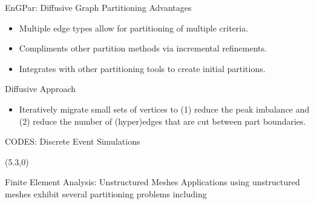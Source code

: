 \documentclass{beamer}
\begin{document}
\begin{textblock}{15.6}
\begin{textblock}{5}
\begin{block}{\centering EnGPar: Diffusive Graph Partitioning}
      Advantages
      \begin{itemize}
      \item Multiple edge types allow for partitioning of multiple criteria.
      \item Compliments other partition methods via incremental refinements.
      \item Integrates with other partitioning tools to create initial partitions.
      \end{itemize}
      
      Diffusive Approach
      \begin{itemize}
      \item Iteratively migrate small sets of vertices to (1) reduce the peak imbalance and (2) reduce the number of (hyper)edges that are cut between part boundaries.
      \end{itemize}
    \end{block}
    \begin{block}{\centering CODES: Discrete Event Simulations}
    \end{block}
  \end{textblock}
  \begin{textblock}{5}(5.3,0)
    \begin{block}{\centering Finite Element Analysis: Unstructured Meshes}
      Applications using unstructured meshes exhibit several partitioning problems including
      \begin{itemize}

\end{itemize}
\end{block}
\end{textblock}
\end{textblock}
\end{document}

